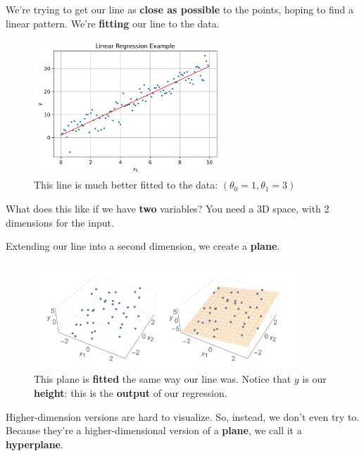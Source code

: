         We're trying to get our line as \textbf{close as possible} to the points, hoping to find a linear pattern. We're \textbf{fitting} our line to the data.
        
        \begin{figure}[H]
        \centering
            \includegraphics[width=70mm,scale=0.5]{images/regression_images/Regression_Example_Good_Fit.png}
        
            \caption*{This line is much better fitted to the data: $(\theta_0=1, \theta_1=3)$}
        \end{figure}
        
        What does this like if we have \textbf{two} variables? You need a 3D space, with 2 dimensions for the input.
        
        Extending our line into a second dimension, we create a \textbf{plane}.
        
        \begin{figure}[H]
        \centering
            \includegraphics[width=100mm,scale=0.5]{images/regression_images/Regression_Plane.png}
        
            \caption*{This plane is \textbf{fitted} the same way our line was. Notice that $y$ is our \textbf{height}: this is the \textbf{output} of our regression.}
        \end{figure}
        
        Higher-dimension versions are hard to visualize. So, instead, we don't even try to. Because they're a higher-dimensional version of a \textbf{plane}, we call it a \textbf{hyperplane}.\\
        
